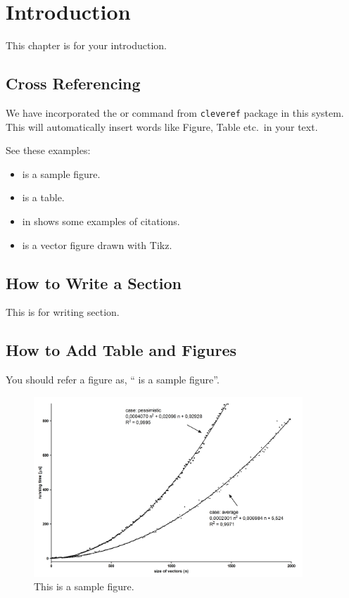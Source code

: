 \chapter{Introduction}\label{intro}

This chapter is for your introduction.

\section{Cross Referencing}
We have incorporated the \verb@\cref@ or \verb@\Cref@ command from
\texttt{cleveref} package in this system. This will automatically
insert words like Figure, Table etc.\ in your text.

See these examples:
\begin{itemize}
\item {} is a sample figure.
\item {} is a table.
\item {} in  shows some examples of
  citations.
  \item {} is a vector figure drawn with Tikz.
\end{itemize}

\section{How to Write a Section}

This is for writing section.

\section{How to Add Table and Figures}\label{contribution}
You should refer a figure as, `` is a sample
figure''.

\begin{figure}[!tb]
  \centering
  \includegraphics[width=0.9\textwidth]{figures/sample}
  \caption{This is a sample figure.}
  \label{fig:sample}
\end{figure}

